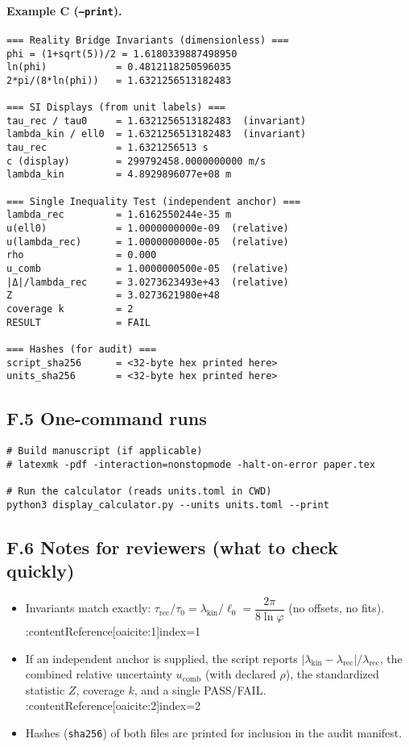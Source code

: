 \documentclass[11pt]{article}
\begin{document}
\begin{proposition}
\paragraph{Example C (\texttt{--print}).}
\begin{verbatim}
=== Reality Bridge Invariants (dimensionless) ===
phi = (1+sqrt(5))/2 = 1.6180339887498950
ln(phi)            = 0.4812118250596035
2*pi/(8*ln(phi))   = 1.6321256513182483

=== SI Displays (from unit labels) ===
tau_rec / tau0     = 1.6321256513182483  (invariant)
lambda_kin / ell0  = 1.6321256513182483  (invariant)
tau_rec            = 1.6321256513 s
c (display)        = 299792458.0000000000 m/s
lambda_kin         = 4.8929896077e+08 m

=== Single Inequality Test (independent anchor) ===
lambda_rec         = 1.6162550244e-35 m
u(ell0)            = 1.0000000000e-09  (relative)
u(lambda_rec)      = 1.0000000000e-05  (relative)
rho                = 0.000
u_comb             = 1.0000000500e-05  (relative)
|Δ|/lambda_rec     = 3.0273623493e+43  (relative)
Z                  = 3.0273621980e+48
coverage k         = 2
RESULT             = FAIL

=== Hashes (for audit) ===
script_sha256      = <32-byte hex printed here>
units_sha256       = <32-byte hex printed here>
\end{verbatim}

\subsection*{F.5 One-command runs}
\begin{verbatim}
# Build manuscript (if applicable)
# latexmk -pdf -interaction=nonstopmode -halt-on-error paper.tex

# Run the calculator (reads units.toml in CWD)
python3 display_calculator.py --units units.toml --print
\end{verbatim}

\subsection*{F.6 Notes for reviewers (what to check quickly)}
\begin{itemize}
  \item Invariants match exactly: \(\tau_{\mathrm{rec}}/\tau_{0} = \lambda_{\mathrm{kin}}/\ell_{0}
  = \dfrac{2\pi}{8\ln\varphi}\) (no offsets, no fits). :contentReference[oaicite:1]{index=1}
  \item If an independent anchor is supplied, the script reports \(|\lambda_{\mathrm{kin}}-\lambda_{\mathrm{rec}}|/\lambda_{\mathrm{rec}}\), the combined relative uncertainty \(u_{\mathrm{comb}}\) (with declared \(\rho\)), the standardized statistic \(Z\), coverage \(k\), and a single PASS/FAIL. :contentReference[oaicite:2]{index=2}
  \item Hashes (\texttt{sha256}) of both files are printed for inclusion in the audit manifest.
\end{itemize}


\end{proposition}
\end{document}
